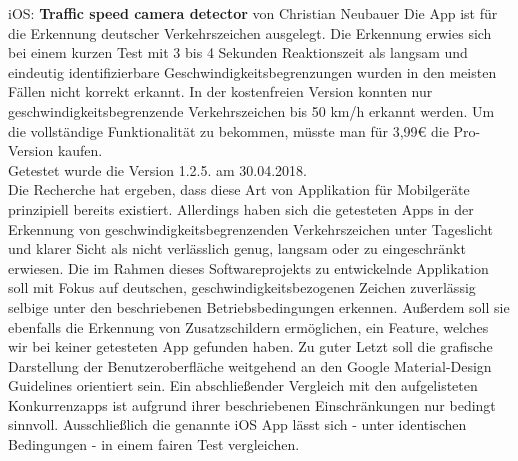 iOS: \textbf{\glqq{}Traffic speed camera detector\grqq{}} von \glqq{}Christian Neubauer\grqq{}
\hline\vspace{4pt}
Die \gls{App} ist für die Erkennung deutscher Verkehrszeichen ausgelegt. Die Erkennung erwies sich bei einem kurzen Test mit 3 bis 4 Sekunden Reaktionszeit als langsam und eindeutig identifizierbare Geschwindigkeitsbegrenzungen wurden in den meisten Fällen nicht korrekt erkannt. In der kostenfreien Version konnten nur geschwindigkeitsbegrenzende Verkehrszeichen bis 50 km/h erkannt werden. Um die vollständige Funktionalität zu bekommen, müsste man für 3,99€ die Pro-Version kaufen.\\
Getestet wurde die Version 1.2.5. am 30.04.2018.\\

Die Recherche hat  ergeben, dass diese Art von Applikation für Mobilgeräte prinzipiell bereits existiert. Allerdings haben sich die getesteten Apps in der Erkennung von geschwindigkeitsbegrenzenden Verkehrszeichen unter Tageslicht und klarer Sicht als nicht verlässlich genug, langsam oder zu eingeschränkt erwiesen. Die im Rahmen dieses Softwareprojekts zu entwickelnde Applikation soll mit Fokus auf deutschen, geschwindigkeitsbezogenen Zeichen zuverlässig selbige unter den beschriebenen Betriebsbedingungen erkennen. Außerdem soll sie ebenfalls die Erkennung von Zusatzschildern ermöglichen, ein Feature, welches wir bei keiner getesteten \gls{App} gefunden haben. Zu guter Letzt soll die grafische Darstellung der Benutzeroberfläche weitgehend an den Google Material-Design Guidelines orientiert sein. Ein abschließender Vergleich mit den aufgelisteten Konkurrenzapps ist aufgrund ihrer beschriebenen Einschränkungen nur bedingt sinnvoll. Ausschließlich die genannte iOS \gls{App} lässt sich - unter identischen Bedingungen - in einem fairen Test vergleichen.

